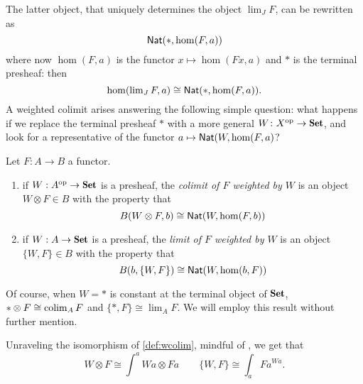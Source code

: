 The latter object, that uniquely determines the object $\lim_J F$, can be
rewritten as
\[
\textsf{Nat}(*, \hom(F,a))
\]
where now $\hom(F,a)$ is the functor $x\mapsto \hom(Fx,a)$ and $*$ is the
terminal presheaf: then
\[\textstyle
\hom(\lim_J F,a)\cong \textsf{Nat}(*, \hom(F,a)).
\]
A weighted colimit arises answering the following simple question: what happens
if we replace the terminal presheaf $*$ with a more general $W\colon X^\opp\to
\Sets$, and look for a representative of the functor $a\mapsto \textsf{Nat}(W,
\hom(F,a)$?
\begin{definition}\label{def:wcolim}
Let $F : A \to B$ a functor.
\begin{enumerate}
	\item if $W : A^\opp\to \Set$ is a presheaf, the \emph{colimit of $F$ weighted
by $W$} is an object $W\otimes F\in B$ with the property that
	\[B(W\otimes F,b)\cong \textsf{Nat}(W, \hom(F,b))\]
	\item if $W : A \to \Set$ is a presheaf, the \emph{limit of $F$ weighted by
$W$} is an object $\{W, F\}\in B$ with the property that
	\[B(b,\{W,F\})\cong \textsf{Nat}(W, \hom(b,F))\]
\end{enumerate}
\end{definition}
\begin{remark}
Of course, when $W=*$ is constant at the terminal object of $\Set$, $*\otimes
F\cong \operatorname*{colim}_A F$ and $\{*,F\}\cong \lim_A F$. We will employ this result
without further mention.
\end{remark}
\begin{remark}\label{wlim-are-coends}
Unraveling the isomorphism of \adef\ref{def:wcolim}, mindful of \cite[???]{McL},
we get that
\[W\otimes F \cong \int^a Wa\otimes Fa\qquad \{W,F\}\cong \int_a Fa^{Wa}.\]
\end{remark}
\begin{remark}

\end{remark}
